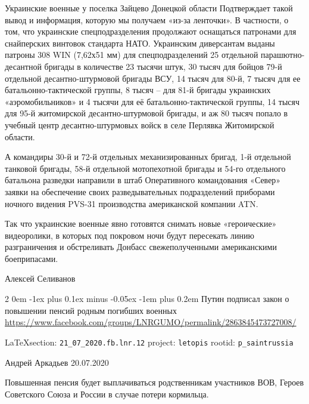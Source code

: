 \documentclass[a4paper,11pt]{extreport}
\makeatletter
\renewcommand\subsection{%
  \clearpage
    \@startsection{subsection}%
    {2}%
    {0em}%
    {-1ex plus 0.1ex minus -0.05ex}%
    {-1em plus 0.2em}%
    {\scshape\bfseries\Large}%
}
\makeatother
\begin{document}
Украинские военные у поселка Зайцево Донецкой области Подтверждает такой вывод
и информация, которую мы получаем «из-за ленточки». В частности, о том, что
украинские спецподразделения продолжают оснащаться патронами для снайперских
винтовок стандарта НАТО. Украинским диверсантам выданы патроны 308 WIN (7,62х51
мм) для спецподразделений 25 отдельной парашютно-десантной бригады в количестве
23 тысячи штук, 30 тысяч для бойцов 79-й отдельной десантно-штурмовой бригады
ВСУ, 14 тысяч для 80-й, 7 тысяч для ее батальонно-тактической группы, 8 тысяч –
для 81-й бригады украинских «аэромобильников» и 4 тысячи для её
батальонно-тактической группы, 14 тысяч для 95-й житомирской десантно-штурмовой
бригады, и аж 80 тысяч попало в учебный центр десантно-штурмовых войск в селе
Перлявка Житомирской области.

А командиры 30-й и 72-й отдельных механизированных бригад, 1-й отдельной
танковой бригады, 58-й отдельной мотопехотной бригады и 54-го отдельного
батальона разведки направили в штаб Оперативного командования «Север» заявки на
обеспечение своих разведывательных подразделений приборами ночного видения
PVS-31 производства американской компании ATN.

Так что украинские военные явно готовятся снимать новые «героические»
видеоролики, в которых под покровом ночи будут пересекать линию разграничения и
обстреливать Донбасс свежеполученными американскими боеприпасами.

Алексей Селиванов
  
 
 
\subsection{Путин подписал закон о повышении пенсий родным погибших военных}
\label{sec:21_07_2020.fb.lnr.12}
\url{https://www.facebook.com/groups/LNRGUMO/permalink/2863845473727008/}
  
\vspace{0.5cm}
{\small\LaTeX section: \verb|21_07_2020.fb.lnr.12| project: \verb|letopis| rootid: \verb|p_saintrussia|}
\vspace{0.5cm}

Андрей Аркадьев
20.07.2020

Повышенная пенсия будет выплачиваться родственникам участников ВОВ, Героев
Советского Союза и России в случае потери кормильца.
\end{document}
